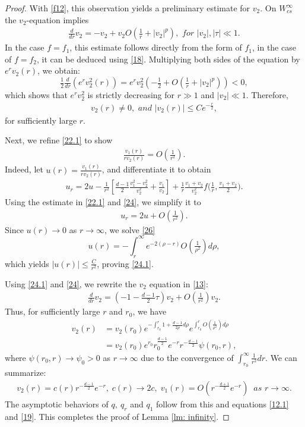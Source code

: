 \documentclass[12pt]{amsart}
\begin{document}
\begin{proof}
With \eqref{f12}, this observation yields a preliminary estimate for $v_2$. 
On $W_{cs}^\infty$ the $v_2$-equation implies
\begin{align}\label{23}
\tfrac d{dr}v_2=-v_2+v_2O(\tfrac 1r+|v_2|^p), \textit{ for } |v_2|, |\tau|\ll 1. 
\end{align}
In the case $f=f_1$, this estimate follows directly from the form of $f_1$, in the case of $f=f_2$, it can be deduced using \eqref{18}.  
Multiplying both sides of the equation by $e^rv_2(r)$, we obtain:
\[\tfrac 12\tfrac d{dr}(e^r v_2^2(r))=e^r v_2^2(-\tfrac 12+O(\tfrac 1r+|v_2|^p))<0,\]
which shows that $e^rv_2^2$ is strictly decreasing for $r\gg1 $ and $|v_2|\ll1$. Therefore,
\begin{align}\label{24}
v_2(r)\neq 0, \textit{ and } |v_2(r)|\le C e^{-\frac r2},
\end{align}
for sufficiently large $r$. 

Next, we refine  \eqref{22.1} to show
\begin{align}\label{24.1}
\tfrac{v_1(r)}{rv_2(r)}=O(\tfrac 1{r^2}). 
\end{align}
Indeed, let $u(r)=\tfrac{v_1(r)}{rv_2(r)}$, and differentiate it to obtain
\begin{align}\label{25}
u_r=2u- \tfrac 1{r^2}[\tfrac{d-1}2\tfrac{v_1^2-v_2^2}{v_2^2}+\tfrac{v_1}{v_2}]+\tfrac 1{r}\tfrac{v_1+v_2}{v_2^2}f\bigl(\tfrac 1r, \tfrac{v_1+v_2}2\bigr). 
\end{align}
Using the estimate in \eqref{22.1} and \eqref{24}, we simplify it to  
\begin{align}\label{26}
u_r=2u+O(\tfrac 1{r^2}).
\end{align}
 Since  $u(r)\to 0$ as $r\to \infty$,  
we solve \eqref{26} 
 \[u(r)=-\int_r^\infty e^{-2(\rho-r)}O(\tfrac 1{\rho^2}) d\rho,\]
which yields $|u(r)|\le \tfrac C{r^2}$, proving \eqref{24.1}. 

Using \eqref{24.1} and \eqref{24}, we rewrite the $v_2$ equation in \eqref{13}:  
\begin{align}\label{27}
\tfrac d{dr} v_2=(-1-\tfrac{d-1}2 \tau)v_2+O(\tfrac 1{r^2})v_2. 
\end{align}
Thus, for sufficiently large $r$ and $r_0$, we have 
\begin{align*}
v_2(r)&=v_2(r_0)e^{-\int_{r_0}^r 1+\frac{d-1}{2\rho} d\rho} e^{\int_{r_0}^r O(\frac 1{\rho^2}) d\rho}\\
&=v_2(r_0)e^{r_0}r_0^{\frac{d-1}2} e^{-r}r^{-\frac{d-1}2}\psi(r_0,r),
\end{align*}
where $\psi(r_0, r)\to \psi_0> 0$ as $r\to \infty$ due to the convergence of $\int_{r_0}^\infty \frac 1{r^2}dr$. We can summarize:
\begin{gather*}
v_2(r)=c(r) r^{-\frac{d-1}2}e^{-r}, \; c(r)\to 2c, \;  v_1(r)=O(r^{-\frac{d+1}2}e^{-r}) \ \textit{ as } r\to \infty.
\end{gather*}
The asymptotic behaviors of $q,\ q_r$ and $q_1$ follow from this and equations  \eqref{12.1} and \eqref{19}. This completes the proof of Lemma \ref{lm: infinity}. 
\end{proof}
\end{document}
